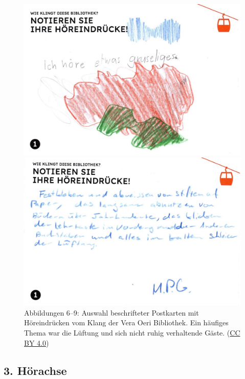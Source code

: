 \documentclass[a4paper,
fontsize=11pt,
oneside,
numbers=noperiodatend,
parskip=half-,
bibliography=totoc,
final
]{scrartcl}
\begin{document}
\begin{figure}[H]
    \begin{minipage}[b]{0.45\textwidth}
        \centering
        \includegraphics[width=\textwidth]{img/Abb8.jpg}
    \end{minipage}
    \begin{minipage}[b]{0.45\textwidth}
        \centering
        \includegraphics[width=\textwidth]{img/Abb9.jpg}
    \end{minipage}
    
    \caption{Abbildungen 6--9: Auswahl beschrifteter Postkarten mit Höreindrücken vom Klang der Vera Oeri Bibliothek. Ein häufiges Thema war die Lüftung und sich nicht ruhig verhaltende Gäste. (\href{https://creativecommons.org/licenses/by/4.0/}{CC BY 4.0})}
\end{figure}



\hypertarget{huxf6rachse-2}{%
\subsection{3. Hörachse}\label{huxf6rachse-2}}
\end{document}

